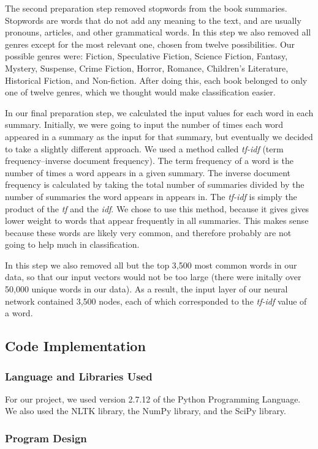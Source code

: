 \documentclass[11pt,letterpaper]{article}
\begin{document}
The second preparation step removed stopwords from the book summaries. Stopwords are words that do not add any meaning to the text, and are usually pronouns, articles, and other grammatical words. In this step we also removed all genres except for the most relevant one, chosen from twelve possibilities. Our possible genres were: Fiction, Speculative Fiction, Science Fiction, Fantasy, Mystery, Suspense, Crime Fiction, Horror, Romance, Children's Literature, Historical Fiction, and Non-fiction. After doing this, each book belonged to only one of twelve genres, which we thought would make classification easier.

In our final preparation step, we calculated the input values for each word in each summary. Initially, we were going to input the number of times each word appeared in a summary as the input for that summary, but eventually we decided to take a slightly different approach. We used a method called \emph{tf-idf} (term frequency--inverse document frequency). The term frequency of a word is the number of times a word appears in a given summary. The inverse document frequency is calculated by taking the total number of summaries divided by the number of summaries the word appears in appears in. The \emph{tf-idf} is simply the product of the \emph{tf} and the \emph{idf}. We chose to use this method, because it gives gives lower weight to words that appear frequently in all summaries. This makes sense because these words are likely very common, and therefore probably are not going to help much in classification.

In this step we also removed all but the top 3,500 most common words in our data, so that our input vectors would not be too large (there were initally over 50,000 unique words in our data). As a result, the input layer of our neural network contained 3,500 nodes, each of which corresponded to the \emph{tf-idf} value of a word.

\subsection{Code Implementation}
\subsubsection{Language and Libraries Used}
For our project, we used version 2.7.12 of the Python Programming Language. We also used the NLTK library, the NumPy library, and the SciPy library.

\subsubsection{Program Design}
\end{document}
